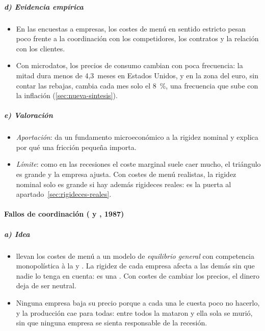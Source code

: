 \documentclass[11pt]{article}
\begin{document}
\subparagraph{d) Evidencia empírica}

\begin{itemize}
\item En las encuestas a empresas, los costes de menú en sentido estricto pesan poco frente a la coordinación con los competidores, los contratos y la relación con los clientes\nocite{BlinderEtAl1998Asking}.
\item Con microdatos, los precios de consumo cambian con poca frecuencia: la mitad dura menos de 4,3~meses en Estados Unidos\nocite{BilsKlenow2004Some}, y en la zona del euro, sin contar las rebajas, cambia cada mes solo el 8~\%\nocite{GautierEtAl2026WP3181}, una frecuencia que sube con la inflación (\ref{sec:nueva-sintesis}).
\end{itemize}

\subparagraph{e) Valoración}

\begin{itemize}
\item \emph{Aportación}: da un fundamento microeconómico a la rigidez nominal y explica por qué una fricción pequeña importa.
\item \emph{Límite}: como en las recesiones el coste marginal suele caer mucho, el triángulo es grande y la empresa ajusta. Con costes de menú realistas, la rigidez nominal solo es grande si hay además rigideces reales\nocite{Romer1993New,BallRomer1990Real}: es la puerta al apartado~\ref{sec:rigideces-reales}.
\end{itemize}

\paragraph{Fallos de coordinación ( y , 1987)}

\subparagraph{a) Idea}

\begin{itemize}
\item \textcite{BlanchardKiyotaki1987Monopolistic} llevan los costes de menú a un modelo de \emph{equilibrio general} con competencia monopolística à la  y  . La rigidez de cada empresa afecta a las demás sin que nadie lo tenga en cuenta: es una . Con costes de cambiar los precios, el dinero deja de ser neutral.
\item Ninguna empresa baja su precio porque a cada una le cuesta poco no hacerlo, y la producción cae para todas: entre todos la mataron y ella sola se murió, sin que ninguna empresa se sienta responsable de la recesión.
\end{itemize}
\end{document}
